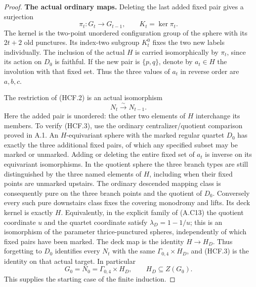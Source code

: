 \begin{proof}
\par\medskip\noindent\textbf{The actual ordinary maps.}\quad
Deleting the last added fixed pair gives a surjection
\[
 \pi_t:G_t\longrightarrow G_{t-1},\qquad K_t=\ker\pi_t.
                                                               \tag{HCF.2}
\]
The kernel is the two-point unordered configuration group
of the sphere with its $2t+2$ old punctures.  Its index-two
subgroup $K_t^0$ fixes the two new labels individually.
The inclusion of the actual $H$ is carried isomorphically
by $\pi_t$, since its action on $D_0$ is faithful.
If the new pair is $\{p,q\}$, denote by $a_t\in H$ the
involution with that fixed set.  Thus the three values
of $a_t$ in reverse order are $a,b,c$.

The restriction of (HCF.2) is an actual isomorphism
\[
                         N_t\xrightarrow{\sim}N_{t-1}.
                                                               \tag{HCF.3}
\]
Here the added pair is unordered: the other two elements
of $H$ interchange its members.  To verify (HCF.3), use
the ordinary centralizer/quotient comparison proved in A.1.
An $H$-equivariant sphere with the marked regular quartet
$D_0$ has exactly the three additional fixed pairs, of
which any specified subset may be marked or unmarked.
Adding or deleting the entire fixed set of $a_t$ is inverse
on its equivariant isomorphisms.  In the quotient sphere
the three branch types are still distinguished by the
three named elements of $H$, including when their fixed
points are unmarked upstairs.  The ordinary descended
mapping class is consequently pure on the three branch
points and the quotient of $D_0$.  Conversely every such
pure downstairs class fixes the covering monodromy and
lifts.  Its deck kernel is exactly $H$.
Equivalently, in the explicit family of (A.C13) the
quotient coordinate $u$ and the quartet coordinate satisfy
$\lambda_D=1-1/u$; this is an isomorphism of the parameter
thrice-punctured spheres, independently of which fixed
pairs have been marked.  The deck map is the identity
$H\to H_D$.  Thus forgetting to $D_0$ identifies every
$N_t$ with the same $\Gamma_{0,4}\times H_D$, and
(HCF.3) is the identity on that actual target.
In particular
\[
       G_0=N_0=\Gamma_{0,4}\times H_D,\qquad
                        H_D\subseteq Z(G_0).           \tag{HCF.4}
\]
This supplies the starting case of the finite induction.


\end{proof}
